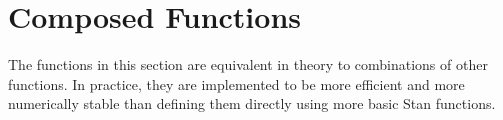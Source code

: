 \section{Composed Functions}\label{composed-functions.section}

The functions in this section are equivalent in theory to combinations
of other functions.  In practice, they are implemented to be more
efficient and more numerically stable than defining them directly
using more basic Stan functions.
%
\begin{description}
\end{description}
